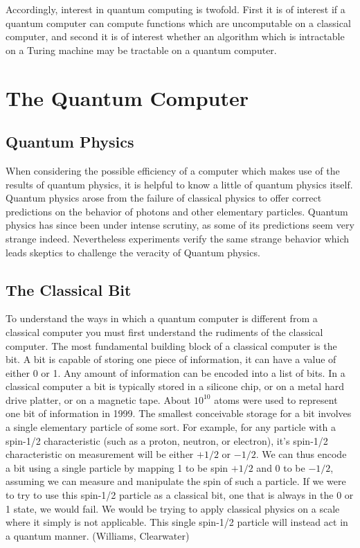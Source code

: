 \documentclass[]{article}
\begin{document}
Accordingly, interest in quantum computing is twofold.  First it is of
interest if a quantum computer can compute functions which are
uncomputable on a classical computer, and second it is of interest
whether an algorithm which is intractable on a Turing machine may be
tractable on a quantum computer.

\section{The Quantum Computer}

\subsection{Quantum Physics}

When considering the possible efficiency of a computer which makes use
of the results of quantum physics, it is helpful to know a little of
quantum physics itself.  Quantum physics arose from the failure of
classical physics to offer correct predictions on the behavior of
photons and other elementary particles.  Quantum physics has since
been under intense scrutiny, as some of its predictions seem very
strange indeed.  Nevertheless experiments verify the same strange
behavior which leads skeptics to challenge the veracity of Quantum
physics.

\subsection{The Classical Bit}

To understand the ways in which a quantum computer is different from a
classical computer you must first understand the rudiments of the
classical computer.  The most fundamental building block of a
classical computer is the bit.  A bit is capable of storing one piece
of information, it can have a value of either 0 or 1.  Any amount of
information can be encoded into a list of bits.  In a classical
computer a bit is typically stored in a silicone chip, or on a metal
hard drive platter, or on a magnetic tape.  About $10^{10}$ atoms were
used to represent one bit of information in 1999.  The smallest
conceivable storage for a bit involves a single elementary particle of
some sort.  For example, for any particle with a spin-1/2
characteristic (such as a proton, neutron, or electron), it's spin-1/2
characteristic on measurement will be either $+1/2$ or $-1/2$.  We can
thus encode a bit using a single particle by mapping 1 to be spin
$+1/2$ and 0 to be $-1/2$, assuming we can measure and manipulate the
spin of such a particle.  If we were to try to use this spin-1/2
particle as a classical bit, one that is always in the 0 or 1 state,
we would fail.  We would be trying to apply classical physics on a
scale where it simply is not applicable.  This single spin-1/2
particle will instead act in a quantum manner. (Williams, Clearwater)
\end{document}
